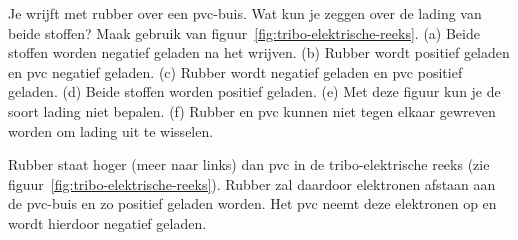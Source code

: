 \documentclass{ximera}
\begin{document}
\begin{question}
    Je wrijft met rubber over een pvc-buis. Wat kun je zeggen over de lading van beide stoffen? Maak gebruik van figuur~\ref{fig:tribo-elektrische-reeks}. (a) Beide stoffen worden negatief geladen na het wrijven. (b) Rubber wordt positief geladen en pvc negatief geladen. (c) Rubber wordt negatief geladen en pvc positief geladen. (d) Beide stoffen worden positief geladen. (e) Met deze figuur kun je de soort lading niet bepalen. (f) Rubber en pvc kunnen niet tegen elkaar gewreven worden om lading uit te wisselen.
    \begin{onlineOnly}
        \begin{selectAll}
        \end{selectAll}
        \begin{solution}
        Rubber staat hoger (meer naar links) dan pvc in de tribo-elektrische reeks (zie figuur~\ref{fig:tribo-elektrische-reeks}). Rubber zal daardoor elektronen afstaan aan de pvc-buis en zo positief geladen worden. Het pvc neemt deze elektronen op en wordt hierdoor negatief geladen. 
        \end{solution}
    \end{onlineOnly}
\end{question}
\end{document}
